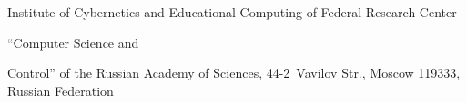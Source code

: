 \titel{\tit}{\aut}{\autkol}{\titkol}





\vspace*{-11pt}








\noindent


Institute of Cybernetics and Educational Computing of Federal Research Center 


``Computer Science and 


Control'' of the Russian Academy of Sciences, 44-2~Vavilov Str., Moscow 119333, Russian Federation





\def\leftfootline{\small{\textbf{\thepage}


\hfill Sistemy i Sredstva Informatiki~---


Systems and Means of Informatics 2021 vol~31 no\,1}


}%


 \def\rightfootline{\small{Sistemy i Sredstva Informatiki~---


 Systems and Means of Informatics 2021 vol~31 no\,1


\hfill \textbf{\thepage}}}


  


  


\vspace*{3pt}








 





